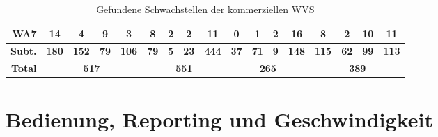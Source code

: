\documentclass[12pt,oneside,a4paper,parskip,pointlessnumbers]{scrbook}
\begin{document}
\begin{table}[H]
\begin{tabular}{|r|c|c|c|c|c|c|c|c|c|c|c|c|c|c|c|c|}
        \hline
        \textbf{WA7} & 14           & 4            & 9           & 3            & 8           & 2          & 2           & 11           & 0           & 1           & 2          & 16           & 8            & 2           & 10          & 11            \\
        \hline
        \textbf{Subt.}        & \textbf{180} & \textbf{152} & \textbf{79} & \textbf{106} & \textbf{79} & \textbf{5} & \textbf{23} & \textbf{444} & \textbf{37} & \textbf{71} & \textbf{9} & \textbf{148} & \textbf{115} & \textbf{62} & \textbf{99} & \textbf{113}  \\
        \hline
        \textbf{Total}           & \multicolumn{4}{c|}{\textbf{517}}                        & \multicolumn{4}{c|}{\textbf{551}}                     & \multicolumn{4}{c|}{\textbf{265}}                     & \multicolumn{4}{c|}{\textbf{389}}                        \\
        \hline
      \end{tabular}
      \caption[Gefundene Schwachstellen der kommerziellen WVS]{Gefundene Schwachstellen der kommerziellen WVS}
    \end{table}

  \section{Bedienung, Reporting und Geschwindigkeit}
\end{document}
